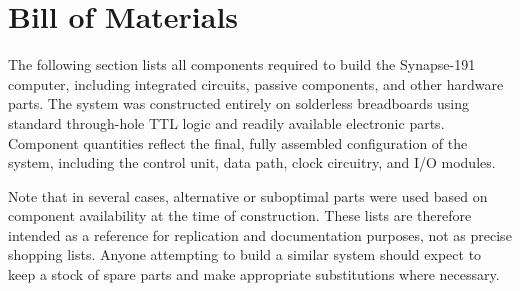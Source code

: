 \section{Bill of Materials}
The following section lists all components required to build the Synapse-191 computer, including
integrated circuits, passive components, and other hardware parts.  
The system was constructed entirely on solderless breadboards using standard through-hole
TTL logic and readily available electronic parts.  
Component quantities reflect the final, fully assembled configuration of the system,
including the control unit, data path, clock circuitry, and I/O modules.

Note that in several cases, alternative or suboptimal parts were used based on component
availability at the time of construction.  
These lists are therefore intended as a reference for replication and documentation purposes,
not as precise shopping lists.  
Anyone attempting to build a similar system should expect to keep a stock of spare parts and
make appropriate substitutions where necessary.

